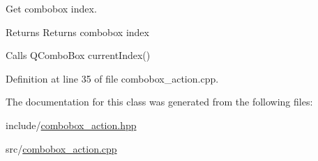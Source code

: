 Get combobox index. 

\begin{DoxyReturn}{Returns}
Returns combobox index
\end{DoxyReturn}
Calls Q\+Combo\+Box current\+Index() 

Definition at line 35 of file combobox\+\_\+action.\+cpp.



The documentation for this class was generated from the following files\+:\begin{DoxyCompactItemize}
\item 
include/\mbox{\hyperlink{combobox__action_8hpp}{combobox\+\_\+action.\+hpp}}\item 
src/\mbox{\hyperlink{combobox__action_8cpp}{combobox\+\_\+action.\+cpp}}\end{DoxyCompactItemize}
